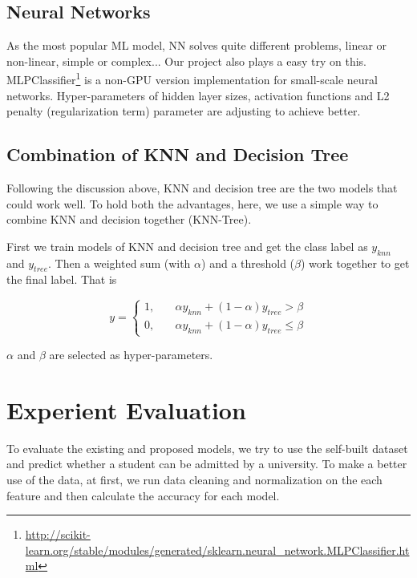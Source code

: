 \documentclass{article}
\begin{document}
\subsection{Neural Networks}

As the most popular ML model, NN solves quite different problems, linear or non-linear, simple or complex... Our project also plays a easy try on this. MLPClassifier\footnote{\url{http://scikit-learn.org/stable/modules/generated/sklearn.neural_network.MLPClassifier.html}} is a non-GPU version implementation for small-scale neural networks. Hyper-parameters of hidden layer sizes, activation functions and L2 penalty (regularization term) parameter are adjusting to achieve better.

\subsection{Combination of KNN and Decision Tree}

Following the discussion above, KNN and decision tree are the two models that could work well. To hold both the advantages, here, we use a simple way to combine KNN and decision together (KNN-Tree).

First we train models of KNN and decision tree and get the class label as $y_{knn}$ and $y_{tree}$. Then a weighted sum (with $\alpha$) and a threshold ($\beta$) work together to get the final label. That is

\begin{equation*}
    y=\left\{
    \begin{aligned}
        1,\quad & \alpha y_{knn}+(1-\alpha)y_{tree}>\beta\\
        0,\quad & \alpha y_{knn}+(1-\alpha)y_{tree}\le\beta
    \end{aligned}\right.
\end{equation*}

$\alpha$ and $\beta$ are selected as hyper-parameters.


\section{Experient Evaluation}

To evaluate the existing and proposed models, we try to use the self-built dataset and predict whether a student can be admitted by a university. To make a better use of the data, at first, we run data cleaning and normalization on the each feature and then calculate the accuracy for each model.
\end{document}
